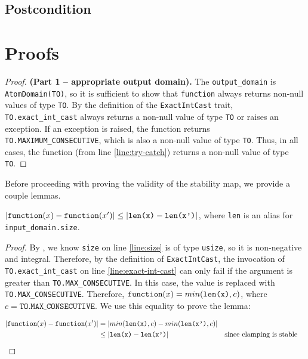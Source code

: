 \documentclass{article}
\begin{document}
\subsection*{Postcondition} 
 
\section{Proofs} 
 
\begin{proof} \textbf{(Part 1 -- appropriate output domain).} 
    The \texttt{output\_domain} is \texttt{AtomDomain(TO)}, so it is sufficient to show that \texttt{function} always returns non-null values of type \texttt{TO}. 
    By the definition of the \texttt{ExactIntCast} trait, \texttt{TO.exact\_int\_cast} always returns a non-null value of type \texttt{TO} or raises an exception. 
    If an exception is raised, the function returns \texttt{TO.MAXIMUM\_CONSECUTIVE}, which is also a non-null value of type \texttt{TO}. 
    Thus, in all cases, the function (from line \ref{line:try-catch}) returns a non-null value of type \texttt{TO}. 
\end{proof} 
 
Before proceeding with proving the validity of the stability map, we provide a couple lemmas. 
 
\begin{lemma} 
    \label{dsym-sens} 
    $|\texttt{function}(x) - \texttt{function}(x')| \leq |\texttt{len(x)} - \texttt{len(x')}|$,  
    where \texttt{len} is an alias for \\ \texttt{input\_domain.size}. 
\end{lemma} 
 
\begin{proof} 
    By , we know \texttt{size} on line \ref{line:size} is of type \texttt{usize},  
    so it is non-negative and integral. 
    Therefore, by the definition of \texttt{ExactIntCast},  
    the invocation of \texttt{TO.exact\_int\_cast} on line \ref{line:exact-int-cast} can only fail if the argument is greater than \texttt{TO.MAX\_CONSECUTIVE}. 
    In this case, the value is replaced with \texttt{TO.MAX\_CONSECUTIVE}. 
    Therefore, $\texttt{function}(x) = min(\texttt{len(x)}, c)$, where $c = \texttt{TO.MAX\_CONSECUTIVE}$. 
    We use this equality to prove the lemma: 
 
    \begin{align*} 
        |\texttt{function}(x) - \texttt{function}(x')| &= |min(\texttt{len(x)}, c) - min(\texttt{len(x')}, c)| \\ 
        &\leq |\texttt{len(x)} - \texttt{len(x')}| &&\text{since clamping is stable} \\ 
    \end{align*} 
\end{proof} 
 
\end{document}
